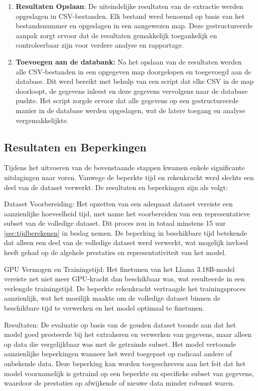 \begin{enumerate}
\item \textbf{Resultaten Opslaan}:
De uiteindelijke resultaten van de extractie werden opgeslagen in CSV-bestanden. Elk bestand werd benoemd op basis van het bestandsnummer en opgeslagen in een aangewezen map. Deze gestructureerde aanpak zorgt ervoor dat de resultaten gemakkelijk toegankelijk en controleerbaar zijn voor verdere analyse en rapportage.

\item \textbf{Toevoegen aan de databank: }Na het opslaan van de resultaten werden alle CSV-bestanden in een opgegeven map doorgelopen en toegevoegd aan de database. Dit werd bereikt met behulp van een script dat elke CSV in de map doorloopt, de gegevens inleest en deze gegevens vervolgens naar de database pushte. Het script zorgde ervoor dat alle gegevens op een gestructureerde manier in de database werden opgeslagen, wat de latere toegang en analyse vergemakkelijkte.

\end{enumerate}

\subsection{Resultaten en Beperkingen}

Tijdens het uitvoeren van de bovenstaande stappen kwamen enkele significante uitdagingen naar voren. Vanwege de beperkte tijd en rekenkracht werd slechts een deel van de dataset verwerkt. De resultaten en beperkingen zijn als volgt:

Dataset Voorbereiding:
Het opzetten van een adequaat dataset vereiste een aanzienlijke hoeveelheid tijd, met name het voorbereiden van een representatieve subset van de volledige dataset. Dit proces zou in totaal minstens 15 uur \autoref{sec:tijdberekenen} in beslag nemen. De beperking in beschikbare tijd betekende dat alleen een deel van de volledige dataset werd verwerkt, wat mogelijk invloed heeft gehad op de algehele prestaties en representativiteit van het model.

GPU Vermogen en Trainingstijd:
Het finetunen van het Llama 3.18B-model vereiste net niet meer GPU-kracht dan beschikbaar was, wat resulteerde in een verlengde trainingstijd. De beperkte rekenkracht vertraagde het trainingsproces aanzienlijk, wat het moeilijk maakte om de volledige dataset binnen de beschikbare tijd te verwerken en het model optimaal te finetunen.

Resultaten:
De evaluatie op basis van de gouden dataset toonde aan dat het model goed presteerde bij het extraheren en verwerken van gegevens, maar alleen op data die vergelijkbaar was met de getrainde subset. Het model vertoonde aanzienlijke beperkingen wanneer het werd toegepast op radicaal andere of onbekende data. Deze beperking kan worden toegeschreven aan het feit dat het model voornamelijk is getraind op een beperkte en specifieke subset van gegevens, waardoor de prestaties op afwijkende of nieuwe data minder robuust waren.




